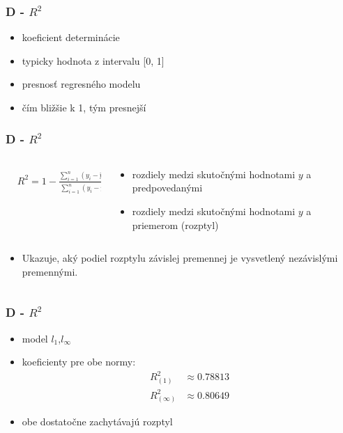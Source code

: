 \documentclass[presentation.tex]{subfiles}
\begin{document}
	
	\begin{frame}
		\frametitle{D - $R^2$ }
		\begin{itemize}
			\item koeficient determinácie
			\item typicky hodnota z intervalu [0, 1]
			\item presnosť regresného modelu
			\item čím bližšie k 1, tým presnejší
		\end{itemize}
		
		
		

	\end{frame}

	\begin{frame}
		\frametitle{D - $R^2$ }
		\begin{columns}
			\begin{column}{0.5\textwidth}
				\centering
				\begin{align*}
						&R^2 = 1 - \frac{\sum_{i=1}^{n} (y_i - \hat{y}_i)^2}{\sum_{i=1}^{n} (y_i - \bar{y})^2}
				\end{align*}
			\end{column}
			\begin{column}{0.5\textwidth}
				\begin{itemize}
					\item rozdiely medzi skutočnými hodnotami $y$ a predpovedanými
					\item  rozdiely medzi skutočnými hodnotami $y$ a priemerom (rozptyl)
				\end{itemize}
				
			\end{column}
		\end{columns}

		\begin{columns}
			\begin{column}{\textwidth}
			\begin{itemize}
				\item Ukazuje, aký podiel rozptylu závislej premennej je vysvetlený nezávislými premennými.
			\end{itemize}
			\end{column}
		\end{columns}
	\end{frame}

	\begin{frame}
		\frametitle{D - $R^2$ }
				\begin{itemize}
					\item model $l_1$,$l_{\infty}$
					\item koeficienty pre obe normy: \begin{align*} R^{2}_{(1)} &\approx  0.78813\\
															     R^{2}_{(\infty)} &\approx 0.80649
													\end{align*}
					\item obe dostatočne zachytávajú rozptyl
				\end{itemize}
			
	\end{frame}
	
\end{document}

